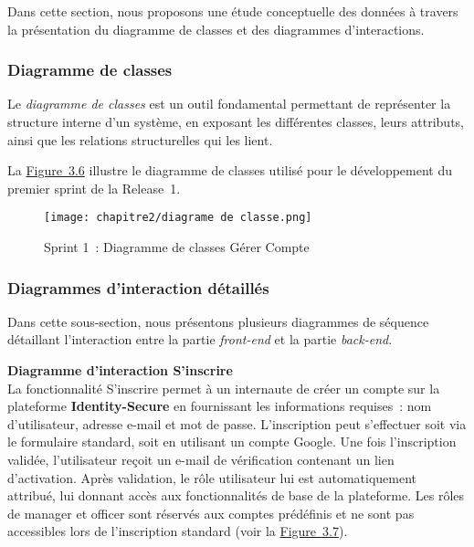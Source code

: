 Dans cette section, nous proposons une étude conceptuelle des données à travers la présentation du diagramme de classes et des diagrammes d'interactions.

\subsubsection{Diagramme de classes}

Le \textit{diagramme de classes} est un outil fondamental permettant de représenter la structure interne d'un système, en exposant les différentes classes, leurs attributs, ainsi que les relations structurelles qui les lient.

La \hyperref[fig:3.6]{Figure~3.6} illustre le diagramme de classes utilisé pour le développement du premier sprint de la Release~1.

\begin{figure}[H]
    \centering
    \texttt{[image: chapitre2/diagrame de classe.png]}
    \caption{Sprint 1~: Diagramme de classes \og Gérer Compte \fg{}}
    \label{fig:3.6}
\end{figure}

\subsubsection{Diagrammes d'interaction détaillés}

Dans cette sous-section, nous présentons plusieurs diagrammes de séquence détaillant l'interaction entre la partie \textit{front-end} et la partie \textit{back-end}.

\medskip

\noindent\textbf{\textendash{} Diagramme d'interaction \og S'inscrire \fg{}}\\
\hspace{1em}La fonctionnalité \og S'inscrire \fg{} permet à un internaute de créer un compte sur la plateforme \textbf{Identity-Secure} en fournissant les informations requises~: nom d'utilisateur, adresse e-mail et mot de passe. L'inscription peut s'effectuer soit via le formulaire standard, soit en utilisant un compte Google. Une fois l'inscription validée, l'utilisateur reçoit un e-mail de vérification contenant un lien d'activation. Après validation, le rôle \og utilisateur \fg{} lui est automatiquement attribué, lui donnant accès aux fonctionnalités de base de la plateforme. Les rôles de \og manager \fg{} et \og officer \fg{} sont réservés aux comptes prédéfinis et ne sont pas accessibles lors de l'inscription standard (voir la \hyperref[fig:3.7]{Figure~3.7}).

